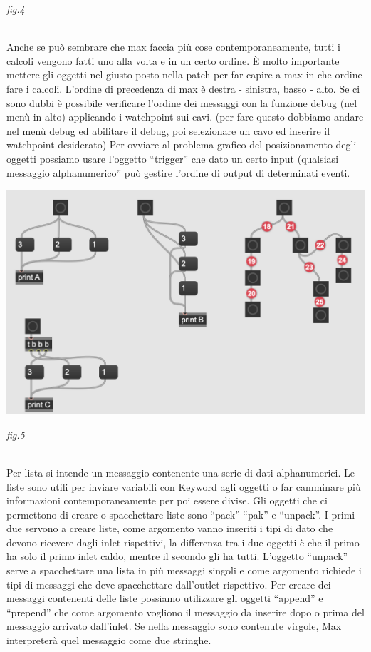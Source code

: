 \documentclass[11pt]{article}
\begin{document}
\begin{multicols*}{2}
\begin{center}
{\scriptsize \emph{fig.4 }}
\end{center}

\textbf{}\\

\noindent Anche se può sembrare che max faccia più cose contemporaneamente, tutti i calcoli vengono fatti uno alla volta e in un certo ordine. È molto importante mettere gli oggetti nel giusto posto nella patch per far capire a max in che ordine fare i calcoli.
L’ordine di precedenza di max è destra - sinistra, basso - alto. Se ci sono dubbi è possibile verificare l’ordine dei messaggi con la funzione debug (nel menù in alto) applicando i watchpoint sui cavi. (per fare questo dobbiamo andare nel menù debug ed abilitare il debug, poi selezionare un cavo ed inserire il watchpoint desiderato)
Per ovviare al problema grafico del posizionamento degli oggetti possiamo usare l’oggetto “trigger” che dato un certo input (qualsiasi messaggio alphanumerico” può gestire l’ordine di output di determinati eventi.

\begin{center}
\includegraphics[scale=0.3]{images/05_debug.png}

{\scriptsize \emph{fig.5 }}
\end{center}

\textbf{}\\

\noindent Per lista si intende un messaggio contenente una serie di dati alphanumerici. Le liste sono utili per inviare variabili con Keyword agli oggetti o far camminare più informazioni contemporaneamente per poi essere divise.
Gli oggetti che ci permettono di creare o spacchettare liste sono “pack” “pak” e “unpack”. I primi due servono a creare liste, come argomento vanno inseriti i tipi di dato che devono ricevere dagli inlet rispettivi, la differenza tra i due oggetti è che il primo ha solo il primo inlet caldo, mentre il secondo gli ha tutti. L’oggetto “unpack” serve a spacchettare una lista in più messaggi singoli e come argomento richiede i tipi di messaggi che deve spacchettare dall’outlet rispettivo.
Per creare dei messaggi contenenti delle liste possiamo utilizzare gli oggetti “append” e “prepend” che come argomento vogliono il messaggio da inserire dopo o prima del messaggio arrivato dall’inlet. Se nella messaggio sono contenute virgole, Max interpreterà quel messaggio come due stringhe.


\end{multicols*}
\end{document}
